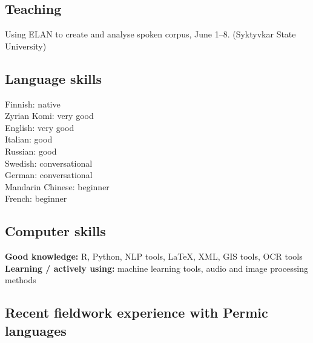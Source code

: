 \documentclass[11pt, a4paper]{article}
\newcommand{\years}[1]{\marginnote{\scriptsize #1}} %
\begin{document}





\subsection*{Teaching}

\years{2017} Using ELAN to create and analyse spoken corpus, June 1--8. (Syktyvkar State University)


\subsection*{Language skills}

Finnish: native\\
Zyrian Komi: very good\\
English: very good\\
Italian: good\\
Russian: good\\
Swedish: conversational\\
German: conversational\\
Mandarin Chinese: beginner\\
French: beginner\\

\subsection*{Computer skills}

\textbf{Good knowledge:} R, Python, NLP tools, LaTeX, XML, GIS tools, OCR tools\\
\textbf{Learning / actively using:} machine learning tools, audio and image processing methods

\subsection*{Recent fieldwork experience with Permic languages}
\end{document}
